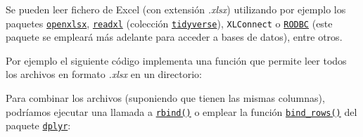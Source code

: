 \documentclass[
]{book}
\newenvironment{Shaded}{\begin{snugshade}}{\end{snugshade}}
\newcommand{\AttributeTok}[1]{\textcolor[rgb]{0.13,0.29,0.53}{#1}}
\newcommand{\CommentTok}[1]{\textcolor[rgb]{0.56,0.35,0.01}{\textit{#1}}}
\newcommand{\ControlFlowTok}[1]{\textcolor[rgb]{0.13,0.29,0.53}{\textbf{#1}}}
\newcommand{\FunctionTok}[1]{\textcolor[rgb]{0.13,0.29,0.53}{\textbf{#1}}}
\newcommand{\NormalTok}[1]{#1}
\newcommand{\OtherTok}[1]{\textcolor[rgb]{0.56,0.35,0.01}{#1}}
\newcommand{\SpecialCharTok}[1]{\textcolor[rgb]{0.81,0.36,0.00}{\textbf{#1}}}
\newcommand{\StringTok}[1]{\textcolor[rgb]{0.31,0.60,0.02}{#1}}
\begin{document}
Se pueden leer fichero de
Excel (con extensión \emph{.xlsx}) utilizando por ejemplo los paquetes \href{https://cran.r-project.org/web/packages/openxlsx/index.html}{\texttt{openxlsx}}, \href{https://readxl.tidyverse.org}{\texttt{readxl}} (colección \href{https://www.tidyverse.org/}{\texttt{tidyverse}}), \texttt{XLConnect} o
\href{https://cran.r-project.org/web/packages/RODBC/index.html}{\texttt{RODBC}} (este paquete se empleará más adelante para acceder a bases de datos),
entre otros.

Por ejemplo el siguiente código implementa una función que permite leer todos
los archivos en formato \emph{.xlsx} en un directorio:

\begin{Shaded}
\end{Shaded}

Para combinar los archivos (suponiendo que tienen las mismas columnas), podríamos ejecutar una llamada a \href{https://www.rdocumentation.org/packages/base/versions/3.6.1/topics/rbind}{\texttt{rbind()}}
o emplear la función \href{https://www.rdocumentation.org/packages/dplyr/versions/0.7.8/topics/bind}{\texttt{bind\_rows()}}
del paquete \href{https://dplyr.tidyverse.org}{\texttt{dplyr}}:
\end{document}
